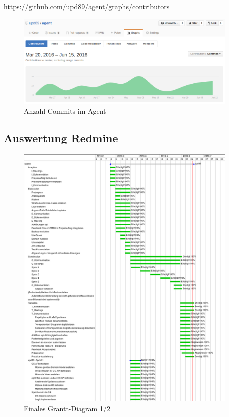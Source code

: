 https://github.com/upd89/agent/graphs/contributors

\begin{figure}
  \centering
    \includegraphics[width=0.95\textwidth]{fig/agent_commits}
  \caption{Anzahl Commits im Agent}
  \label{fig:commits-a}
\end{figure}

\subsection*{Auswertung Redmine}

\begin{figure}
  \centering
    \includegraphics[width=0.95\textwidth]{fig/upd89-gantt-part1}
  \caption{Finales Grantt-Diagram 1/2}
  \label{fig:gantt-final1}
\end{figure}

